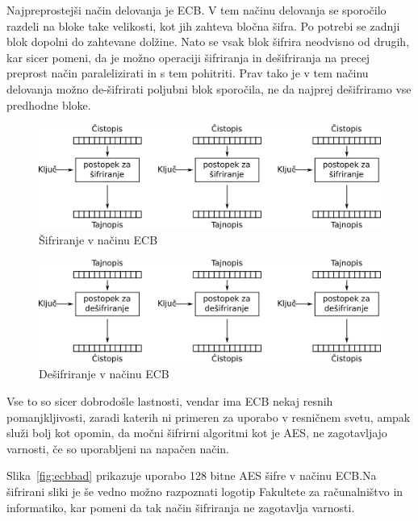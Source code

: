 \documentclass[12pt,a4paper,openany,tikz]{book}
\theoremstyle{plain}
\theoremstyle{definition}
\begin{document}
Najpreprostejši način delovanja je \gls{ECB}. V tem načinu delovanja se sporočilo razdeli na bloke take velikosti, kot jih zahteva bločna šifra. Po potrebi se zadnji blok dopolni do zahtevane dolžine. Nato se vsak blok šifrira neodvisno od drugih, kar sicer pomeni, da je možno operaciji šifriranja in dešifriranja na precej preprost način paralelizirati in s tem pohitriti. Prav tako je v tem načinu delovanja možno de-šifrirati poljubni blok sporočila, ne da najprej dešifriramo vse predhodne bloke.

\begin{figure}[ht!]
  \centering
    \includegraphics[width=\textwidth]{images/ECB_encryption}
    \caption{Šifriranje v načinu \gls{ECB}}
\label{fig:ecbenc}
\end{figure}

\begin{figure}[ht!]
  \centering
    \includegraphics[width=\textwidth]{images/ECB_decryption}
    \caption{Dešifriranje v načinu \gls{ECB}}
\label{fig:ecbdec}
\end{figure}


Vse to so sicer dobrodošle lastnosti, vendar ima \gls{ECB} nekaj resnih pomanjkljivosti, zaradi katerih ni primeren za uporabo v resničnem svetu, ampak služi bolj kot opomin, da močni šifrirni algoritmi kot je \gls{AES}, ne zagotavljajo varnosti, če so uporabljeni na napačen način.

Slika~\ref{fig:ecbbad} prikazuje uporabo 128 bitne AES šifre v načinu ECB.\@ Na šifrirani sliki je še vedno možno razpoznati logotip Fakultete za računalništvo in informatiko, kar pomeni da tak način šifriranja ne zagotavlja varnosti.
\end{document}

